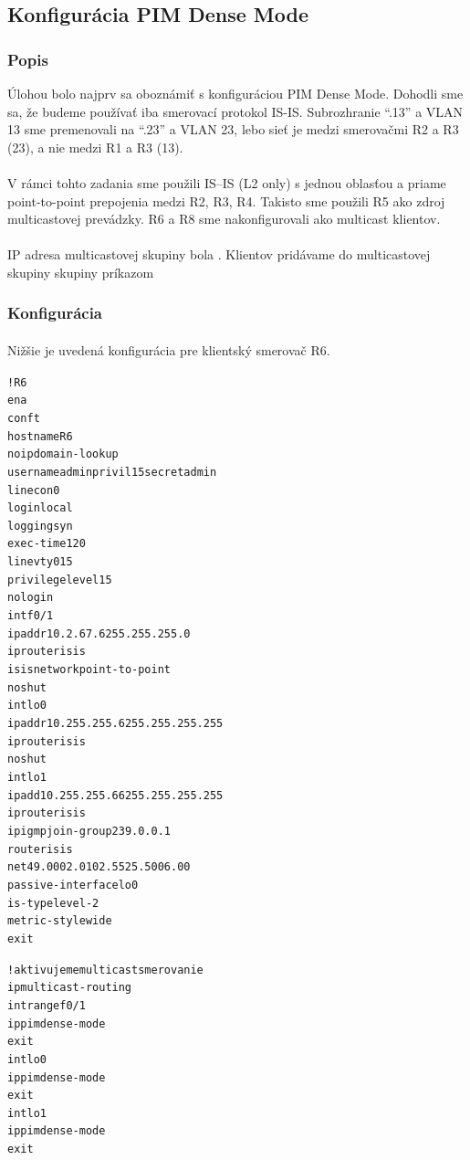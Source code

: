 \documentclass[12pt,twoside,a4paper]{report}
\begin{document}
\subsection{Konfigurácia PIM Dense Mode}
\subsubsection{Popis}
Úlohou bolo najprv sa oboznámiť s konfiguráciou PIM Dense Mode. Dohodli sme sa, že budeme používať iba smerovací protokol IS-IS.
Subrozhranie “.13” a VLAN 13 sme premenovali na “.23” a VLAN 23, lebo sieť je medzi smerovačmi R2 a R3 (23), a nie medzi R1 a R3 (13).

\paragraph{}
V rámci tohto zadania sme použili IS–IS (L2 only) s jednou oblasťou a priame point-to-point prepojenia medzi R2, R3, R4. Takisto sme použili R5 ako zdroj multicastovej prevádzky. R6 a R8 sme nakonfigurovali ako multicast klientov.

\paragraph{}
IP adresa multicastovej skupiny bola . Klientov pridávame do multicastovej skupiny skupiny príkazom 


\subsubsection{Konfigurácia}
\paragraph{}
Nižšie je uvedená konfigurácia pre klientský smerovač R6.

\noindent
{\selectfont
\begin{small}
\begin{alltt}
!R6
ena
conf t
hostname R6
no ip domain-lookup
username admin privil 15 secret admin
line con 0
  login local
  logging syn
  exec-time 120
line vty 0 15
  privilege level 15
  no login
int f0/1
  ip addr 10.2.67.6 255.255.255.0
  ip router isis
  isis network point-to-point
  no shut
int lo0
  ip addr 10.255.255.6 255.255.255.255
  ip router isis
  no shut
int lo1
  ip add 10.255.255.66 255.255.255.255
  ip router isis
  ip igmp join-group 239.0.0.1
router isis
  net 49.0002.0102.5525.5006.00
  passive-interface lo0
  is-type level-2
  metric-style wide
  exit

!aktivujeme multicast smerovanie
ip multicast-routing
int range f0/1
  ip pim dense-mode
  exit
int lo0
  ip pim dense-mode
  exit
int lo1
  ip pim dense-mode
  exit
\end{alltt}
\end{small}
}
\end{document}
